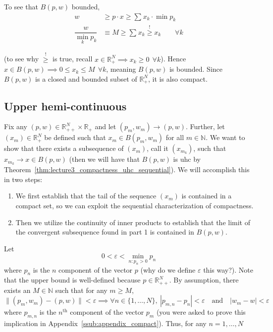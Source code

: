 \documentclass{article}
\newcommand{\R}{\mathbb{R}}
\newcommand{\N}{\mathbb{N}}
\theoremstyle{mythm}
\theoremstyle{mydef}
\begin{document}
To see that $B(p,w)$ bounded,
\begin{align*}
  w
  &
  \ge
  p \cdot x
  \ge
  \sum^{}_{} x_k \cdot \min p_k
  \\
  \dfrac{w}{\min_k p_k}
  &
  \equiv
  M
  \ge
  \sum^{}_{} x_k
  \stackrel{!}{\ge}
  x_k
  \quad
  \quad
  \forall k
\end{align*}

(to see why $\stackrel{!}{\ge}$ is true, recall $x \in \mathbb{R}^N_+ \implies x_k \ge 0 ~~ \forall k$).  Hence $x \in B(p, w) \implies 0 \le x_k \le M ~~ \forall k$, meaning $B(p, w)$ is bounded. Since $B(p, w)$ is a closed and bounded subset of $\mathbb{R}^N_+$, it is also compact.

\subsection{Upper hemi-continuous}
\label{ssub:appendix_upper_hemi_continuous}
Fix any $(p,w)\in \R^N_{++}\times \R_+$ and let $(p_m,w_m)\to (p,w)$. Further, let $(x_m) \in \R^N_{+}$ be defined such that $x_m \in B(p_m,w_m)$ for all $m\in\N$. We want to show that there exists a subsequence of $(x_m)$, call it $(x_{m_k})$, such that $x_{m_k} \to x \in B(p,w)$ (then we will have that $B(p,w)$ is uhc by Theorem~\ref{thm:lecture3_compactness_uhc_sequential}). We will accomplish this in two steps:
\begin{enumerate}
    \item We first establish that the tail of the sequence $(x_m)$ is contained in a compact set, so we can exploit the sequential characterization of compactness. 
    \item Then we utilize the continuity of inner products to establish that the limit of the convergent subsequence found in part 1 is contained in $B(p,w)$. 
\end{enumerate}
Let
\begin{equation*}
    0 < \varepsilon < \min_{n:p_n>0} p_n
\end{equation*}
where $p_n$ is the $n$ component of the vector $p$ (why do we define $\varepsilon$ this way?). Note that the upper bound is well-defined because $p\in \R^N_{++}$. By assumption, there exists an $M\in \N$ such that for any $m\geq M$,
\begin{equation*}
    \lVert (p_m, w_m) - (p,w) \rVert < \varepsilon \implies \forall n\in\{1,\hdots,N\}, ~ |p_{m,n} - p_n| < \varepsilon \quad \text{and} \quad |w_m-w|<\varepsilon
\end{equation*}
where $p_{m,n}$ is the $n^{\text{th}}$ component of the vector $p_m$ (you were asked to prove this implication in Appendix~\ref{ssub:appendix_compact}). Thus, for any $n=1,\hdots,N$
\end{document}
